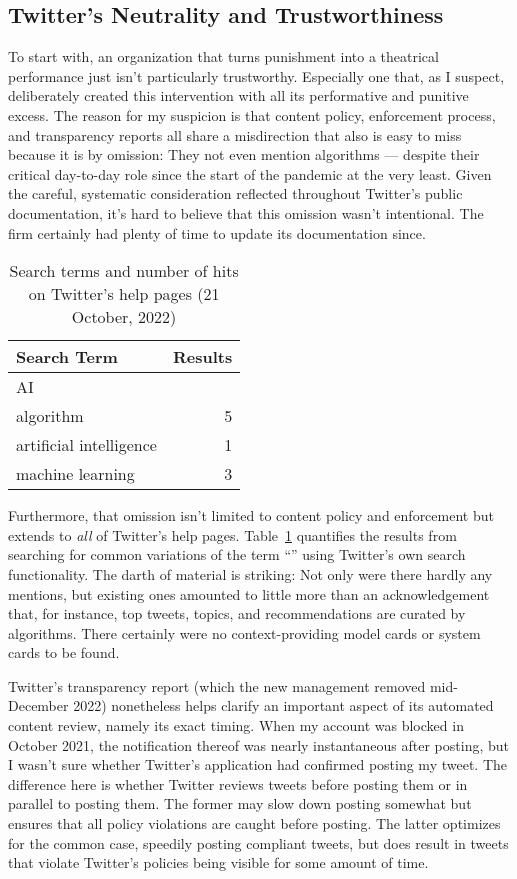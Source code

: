 \subsection{Twitter's Neutrality and Trustworthiness}

To start with, an organization that turns punishment into a theatrical
performance just isn't particularly trustworthy. Especially one that, as I
suspect, deliberately created this intervention with all its performative and
punitive excess. The reason for my suspicion is that content policy, enforcement
process, and transparency reports all share a misdirection that also is easy to
miss because it is by omission: They not even mention algorithms --- despite
their critical day-to-day role since the start of the pandemic at the very
least. Given the careful, systematic consideration reflected throughout
Twitter's public documentation, it's hard to believe that this omission wasn't
intentional. The firm certainly had plenty of time to update its documentation
since.

\begin{table}
\caption{Search terms and number of hits on Twitter's help pages (21 October, 2022)}
\label{table:search}
\begin{tabular}{lr}
\textbf{Search Term} & \textbf{Results} \B \\ \hline
AI & \T0 \\
algorithm & 5 \\
artificial intelligence & 1 \\
machine learning & 3 \\
\end{tabular}
\end{table}

Furthermore, that omission isn't limited to content policy and enforcement but
extends to \emph{all} of Twitter's help pages. Table~\ref{table:search}
quantifies the results from searching for common variations of the term ``\AI''
using Twitter's own search functionality. The darth of material is striking: Not
only were there hardly any mentions, but existing ones amounted to little more
than an acknowledgement that, for instance, top tweets, topics, and
recommendations are curated by algorithms. There certainly were no
context-providing model cards or system cards to be found.

Twitter's transparency report (which the new management removed mid-December
2022) nonetheless helps clarify an important aspect of its automated content
review, namely its exact timing. When my account was blocked in October 2021,
the notification thereof was nearly instantaneous after posting, but I wasn't
sure whether Twitter's application had confirmed posting my tweet. The
difference here is whether Twitter reviews tweets before posting them or in
parallel to posting them. The former may slow down posting somewhat but ensures
that all policy violations are caught before posting. The latter optimizes for
the common case, speedily posting compliant tweets, but does result in tweets
that violate Twitter's policies being visible for some amount of time.

